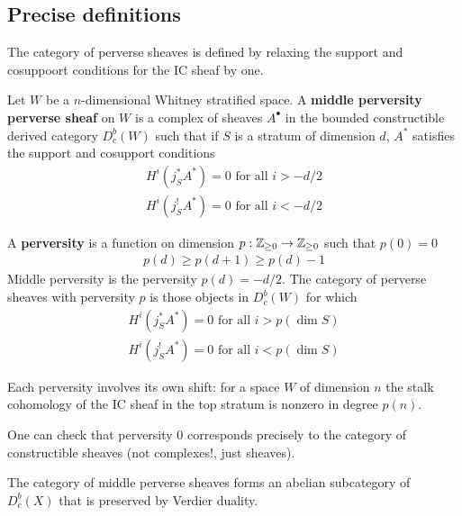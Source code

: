 \subsection{Precise definitions}
The category of perverse sheaves is defined by relaxing 
the support and cosuppoort conditions for the IC sheaf by one.

\begin{definition}
    Let $W$ be a $n$-dimensional Whitney stratified space. A \textbf{middle perversity 
    perverse sheaf} on $W$ is a complex of sheaves $A^\bullet$ in the bounded 
    constructible derived category $D^b_c(W)$ such that if $S$ is a stratum of 
    dimension $d$, $A^*$ satisfies the support and cosupport conditions
    \begin{align*}
        H^i(j^*_SA^*) = 0 \text{ for all } i > -d/2\\
        H^i(j^!_SA^*) = 0 \text{ for all } i < -d/2
    \end{align*}
\end{definition}

\begin{definition}
    A \textbf{perversity} is a function on dimension $p:\mathbb{Z}_{\geq 0}\to \mathbb{Z}_{\geq 0}$
     such that $p(0) = 0$ \begin{align*}
        p(d) \geq p(d+1) \geq p(d) - 1
     \end{align*} Middle perversity is the perversity $p(d) = -d/2$. The 
     category of perverse sheaves with perversity $p$ is those objects in $D^b_c(W)$
     for which \begin{align*}
        H^i(j^*_SA^*) = 0 \text{ for all } i > p(\dim S)\\
        H^i(j^!_SA^*) = 0 \text{ for all } i < p(\dim S)
    \end{align*}
\end{definition}
Each perversity involves its own shift: for a space $W$ of dimension $n$ the stalk
cohomology of the IC sheaf in the top stratum is nonzero in degree $p(n)$.

\begin{remark}
    One can check that perversity $0$ corresponds precisely to the 
    category of constructible sheaves (not complexes!, just sheaves).
\end{remark}

\begin{theorem}
    The category of middle perverse sheaves forms an abelian
    subcategory of $D^b_c(X)$ that is preserved by Verdier duality.
\end{theorem}

